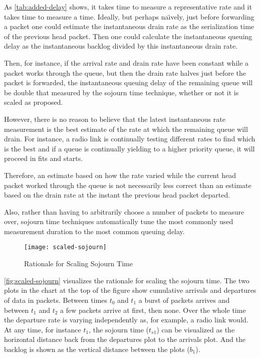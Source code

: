 As \autoref{tab:added-delay} shows, it takes time to measure a representative rate and it takes time to measure a time. Ideally, but perhaps na\"{\i}vely, just before forwarding a packet one could estimate the instantaneous drain rate as the serialization time of the previous head packet. Then one could calculate the instantaneous queuing delay as the instantaneous backlog divided by this instantaneous drain rate.

Then, for instance, if the arrival rate and drain rate have been constant while a packet works through the queue, but then the drain rate halves just before the packet is forwarded, the instantaneous queuing delay of the remaining queue will be double that measured by the sojourn time technique, whether or not it is scaled as proposed. 

However, there is no reason to believe that the latest instantaneous rate measurement is the best estimate of the rate at which the remaining queue will drain. For instance, a radio link is continually testing different rates to find which is the best and if a queue is continually yielding to a higher priority queue, it will proceed in fits and starts. 

Therefore, an estimate based on how the rate varied while the current head packet worked through the queue is not necessarily less correct than an estimate based on the drain rate at the instant the previous head packet departed.

Also, rather than having to arbitrarily choose a number of packets to measure over, sojourn time techniques automatically tune the most commonly used measurement duration to the most common queuing delay.

\begin{figure}[h]
	\centering
	\texttt{[image: scaled-sojourn]}
	\caption{Rationale for Scaling Sojourn Time}\label{fig:scaled-sojourn}
\end{figure}

\autoref{fig:scaled-sojourn} visualizes the rationale for scaling the sojourn time. The two plots in the chart at the top of the figure show cumulative arrivals and departures of data in packets. Between times \(t_0\) and \(t_1\) a burst of packets arrives and between \(t_1\) and \(t_2\) a few packets arrive at first, then none. Over the whole time the departure rate is varying independently as, for example, a radio link would. At any time, for instance \(t_1\), the sojourn time  (\(t_{s1}\)) can be visualized as the horizontal distance back from the departures plot to the arrivals plot. And the backlog is shown as the vertical distance between the plots (\(b_1\)).

